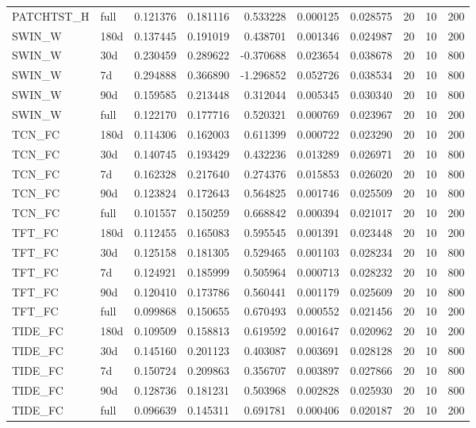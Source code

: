 \begin{tabular}{llrrrrrrrr}
PATCHTST\_H & full & 0.121376 & 0.181116 & 0.533228 & 0.000125 & 0.028575 & 20 & 10 & 200 \\
SWIN\_W & 180d & 0.137445 & 0.191019 & 0.438701 & 0.001346 & 0.024987 & 20 & 10 & 200 \\
SWIN\_W & 30d & 0.230459 & 0.289622 & -0.370688 & 0.023654 & 0.038678 & 20 & 10 & 800 \\
SWIN\_W & 7d & 0.294888 & 0.366890 & -1.296852 & 0.052726 & 0.038534 & 20 & 10 & 800 \\
SWIN\_W & 90d & 0.159585 & 0.213448 & 0.312044 & 0.005345 & 0.030340 & 20 & 10 & 800 \\
SWIN\_W & full & 0.122170 & 0.177716 & 0.520321 & 0.000769 & 0.023967 & 20 & 10 & 200 \\
TCN\_FC & 180d & 0.114306 & 0.162003 & 0.611399 & 0.000722 & 0.023290 & 20 & 10 & 200 \\
TCN\_FC & 30d & 0.140745 & 0.193429 & 0.432236 & 0.013289 & 0.026971 & 20 & 10 & 800 \\
TCN\_FC & 7d & 0.162328 & 0.217640 & 0.274376 & 0.015853 & 0.026020 & 20 & 10 & 800 \\
TCN\_FC & 90d & 0.123824 & 0.172643 & 0.564825 & 0.001746 & 0.025509 & 20 & 10 & 800 \\
TCN\_FC & full & 0.101557 & 0.150259 & 0.668842 & 0.000394 & 0.021017 & 20 & 10 & 200 \\
TFT\_FC & 180d & 0.112455 & 0.165083 & 0.595545 & 0.001391 & 0.023448 & 20 & 10 & 200 \\
TFT\_FC & 30d & 0.125158 & 0.181305 & 0.529465 & 0.001103 & 0.028234 & 20 & 10 & 800 \\
TFT\_FC & 7d & 0.124921 & 0.185999 & 0.505964 & 0.000713 & 0.028232 & 20 & 10 & 800 \\
TFT\_FC & 90d & 0.120410 & 0.173786 & 0.560441 & 0.001179 & 0.025609 & 20 & 10 & 800 \\
TFT\_FC & full & 0.099868 & 0.150655 & 0.670493 & 0.000552 & 0.021456 & 20 & 10 & 200 \\
TIDE\_FC & 180d & 0.109509 & 0.158813 & 0.619592 & 0.001647 & 0.020962 & 20 & 10 & 200 \\
TIDE\_FC & 30d & 0.145160 & 0.201123 & 0.403087 & 0.003691 & 0.028128 & 20 & 10 & 800 \\
TIDE\_FC & 7d & 0.150724 & 0.209863 & 0.356707 & 0.003897 & 0.027866 & 20 & 10 & 800 \\
TIDE\_FC & 90d & 0.128736 & 0.181231 & 0.503968 & 0.002828 & 0.025930 & 20 & 10 & 800 \\
TIDE\_FC & full & 0.096639 & 0.145311 & 0.691781 & 0.000406 & 0.020187 & 20 & 10 & 200 \\

\end{tabular}
